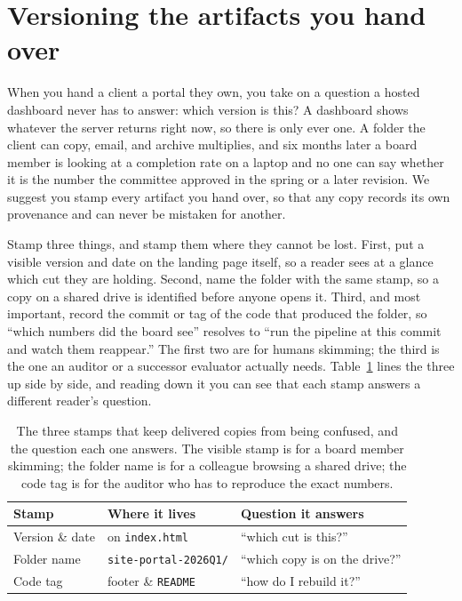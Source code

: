 \section{Versioning the artifacts you hand over}\label{sec:versioning}
When you hand a client a portal they own, you take on a question a hosted dashboard never has to answer: which version is this? A dashboard shows whatever the server returns right now, so there is only ever one. A folder the client can copy, email, and archive multiplies, and six months later a board member is looking at a completion rate on a laptop and no one can say whether it is the number the committee approved in the spring or a later revision. We suggest you stamp every artifact you hand over, so that any copy records its own provenance and can never be mistaken for another.

Stamp three things, and stamp them where they cannot be lost. First, put a visible version and date on the landing page itself, so a reader sees at a glance which cut they are holding. Second, name the folder with the same stamp, so a copy on a shared drive is identified before anyone opens it. Third, and most important, record the commit or tag of the code that produced the folder, so \enquote{which numbers did the board see} resolves to \enquote{run the pipeline at this commit and watch them reappear.} The first two are for humans skimming; the third is the one an auditor or a successor evaluator actually needs. Table~\ref{tab:stamps} lines the three up side by side, and reading down it you can see that each stamp answers a different reader's question.

\begin{table}[htbp]
\centering
\footnotesize
\caption[What to stamp on a delivered portal]{The three stamps that keep delivered copies from being confused, and the question each one answers. The visible stamp is for a board member skimming; the folder name is for a colleague browsing a shared drive; the code tag is for the auditor who has to reproduce the exact numbers.}
\label{tab:stamps}
\begin{tabular}{lll}
\hline
Stamp & Where it lives & Question it answers \\
\hline
Version \& date & on \texttt{index.html} & \enquote{which cut is this?} \\
Folder name     & \texttt{site-portal-2026Q1/} & \enquote{which copy is on the drive?} \\
Code tag        & footer \& \texttt{README} & \enquote{how do I rebuild it?} \\
\hline
\end{tabular}
\end{table}

